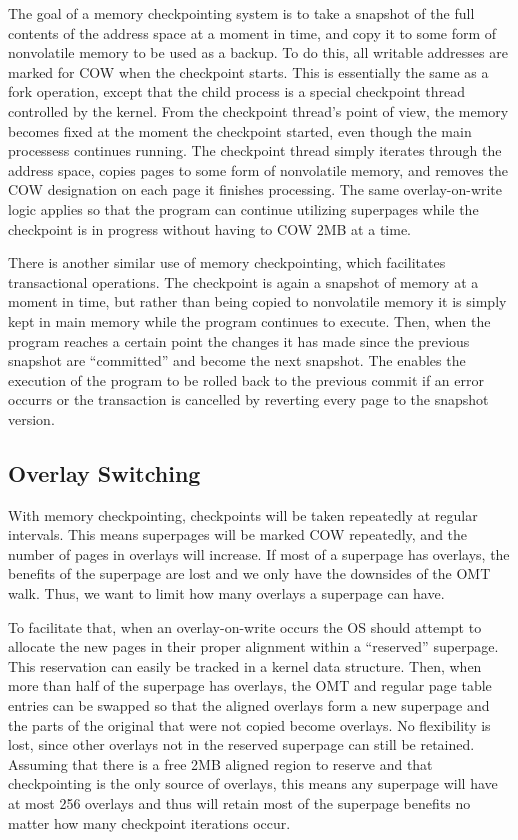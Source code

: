 The goal of a memory checkpointing system is to take a snapshot of the full contents of the address space at a moment in time, and copy it to some form of nonvolatile memory to be used as a backup. To do this, all writable addresses are marked for COW when the checkpoint starts. This is essentially the same as a fork operation, except that the child process is a special checkpoint thread controlled by the kernel. From the checkpoint thread's point of view, the memory becomes fixed at the moment the checkpoint started, even though the main processess continues running. The checkpoint thread simply iterates through the address space, copies pages to some form of nonvolatile memory, and removes the COW designation on each page it finishes processing. The same overlay-on-write logic applies so that the program can continue utilizing superpages while the checkpoint is in progress without having to COW 2MB at a time.

There is another similar use of memory checkpointing, which facilitates transactional operations. The checkpoint is again a snapshot of memory at a moment in time, but rather than being copied to nonvolatile memory it is simply kept in main memory while the program continues to execute. Then, when the program reaches a certain point the changes it has made since the previous snapshot are ``committed'' and become the next snapshot. The enables the execution of the program to be rolled back to the previous commit if an error occurrs or the transaction is cancelled by reverting every page to the snapshot version.

\subsection{Overlay Switching}
With memory checkpointing, checkpoints will be taken repeatedly at regular intervals. This means superpages will be marked COW repeatedly, and the number of pages in overlays will increase. If most of a superpage has overlays, the benefits of the superpage are lost and we only have the downsides of the OMT walk. Thus, we want to limit how many overlays a superpage can have.

To facilitate that, when an overlay-on-write occurs the OS should attempt to allocate the new pages in their proper alignment within a ``reserved'' superpage. This reservation can easily be tracked in a kernel data structure. Then, when more than half of the superpage has overlays, the OMT and regular page table entries can be swapped so that the aligned overlays form a new superpage and the parts of the original that were not copied become overlays. No flexibility is lost, since other overlays not in the reserved superpage can still be retained. Assuming that there is a free 2MB aligned region to reserve and that checkpointing is the only source of overlays, this means any superpage will have at most 256 overlays and thus will retain most of the superpage benefits no matter how many checkpoint iterations occur.

